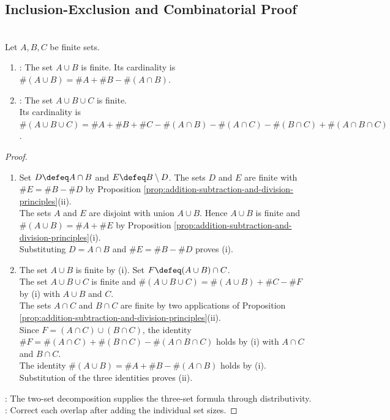 \subsection{Inclusion-Exclusion and Combinatorial Proof}

\begin{proposition} \label{prop:finite-inclusion-exclusion-two-three-sets} \\
Let $A,B,C$ be finite sets.
\begin{enumerate}[label=(\roman*)]
\setlength{\itemsep}{0pt}
\item {}: The set $A\cup B$ is finite. Its cardinality is $\#(A\cup B)=\#A+\#B-\#(A\cap B)$.
\item {}: The set $A\cup B\cup C$ is finite.\\
Its cardinality is $\#(A\cup B\cup C)=\#A+\#B+\#C-\#(A\cap B)-\#(A\cap C)-\#(B\cap C)+\#(A\cap B\cap C)$.
\end{enumerate}
\begin{proof}
\begin{enumerate}[label=(\roman*)]
\setlength{\itemsep}{0pt}
\item Set $D\defeq A\cap B$ and $E\defeq B\setminus D$. The sets $D$ and $E$ are finite with $\#E=\#B-\#D$ by Proposition \ref{prop:addition-subtraction-and-division-principles}(ii).\\
The sets $A$ and $E$ are disjoint with union $A\cup B$. Hence $A\cup B$ is finite and $\#(A\cup B)=\#A+\#E$ by Proposition \ref{prop:addition-subtraction-and-division-principles}(i).\\
Substituting $D=A\cap B$ and $\#E=\#B-\#D$ proves (i).
\item The set $A\cup B$ is finite by (i). Set $F\defeq(A\cup B)\cap C$.\\
The set $A\cup B\cup C$ is finite and $\#(A\cup B\cup C)=\#(A\cup B)+\#C-\#F$ by (i) with $A\cup B$ and $C$.\\
The sets $A\cap C$ and $B\cap C$ are finite by two applications of Proposition \ref{prop:addition-subtraction-and-division-principles}(ii).\\
Since $F=(A\cap C)\cup(B\cap C)$, the identity $\#F=\#(A\cap C)+\#(B\cap C)-\#(A\cap B\cap C)$ holds by (i) with $A\cap C$ and $B\cap C$.\\
The identity $\#(A\cup B)=\#A+\#B-\#(A\cap B)$ holds by (i). Substitution of the three identities proves (ii).
\end{enumerate}
: The two-set decomposition supplies the three-set formula through distributivity.\\
: Correct each overlap after adding the individual set sizes.
\end{proof}
\end{proposition}

